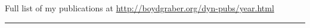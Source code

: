 

\clearpage




\begin{center}
Full list of my publications at \url{http://boydgraber.org/dyn-pubs/year.html}
\end{center}


\noindent\rule{4cm}{0.4pt}


